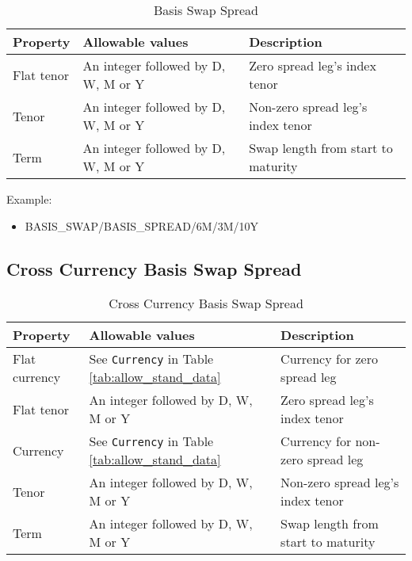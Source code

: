 \begin{table}[H]
\centering
\begin{tabular}{|p{3cm}|p{3.5cm}|p{7cm}|}
\hline
{\bf Property} & {\bf Allowable values} & {\bf Description} \\
\hline
Flat tenor & An integer followed by D, W, M or Y & Zero spread leg's index tenor\\ \hline
Tenor & An integer followed by D, W, M or Y & Non-zero spread leg's index tenor\\ \hline
Term & An integer followed by D, W, M or Y & Swap length from start to maturity\\ 
\hline
\end{tabular}
  \caption{Basis Swap Spread}
  \label{tab:basisspread_quote}
\end{table}


\medskip
Example: 
\begin{itemize}
\item {BASIS\_SWAP/BASIS\_SPREAD/6M/3M/10Y}
\end{itemize}

\subsection{Cross Currency Basis Swap Spread}

\begin{table}[H]
\centering
\begin{tabular}{|p{3cm}|p{3.5cm}|p{7cm}|}
\hline
{\bf Property} & {\bf Allowable values} & {\bf Description} \\
\hline
Flat currency & See \lstinline!Currency! in Table \ref{tab:allow_stand_data} & Currency for zero spread leg\\  \hline
Flat tenor & An integer followed by D, W, M or Y & Zero spread leg's index tenor\\ \hline
Currency & See \lstinline!Currency! in Table \ref{tab:allow_stand_data}& Currency for non-zero spread leg\\ \hline
Tenor & An integer followed by D, W, M or Y & Non-zero spread leg's index tenor\\ \hline
Term & An integer followed by D, W, M or Y & Swap length from start to maturity\\
\hline
\end{tabular}
  \caption{Cross Currency Basis Swap Spread}
  \label{tab:ccbasisspread_quote}
\end{table}



